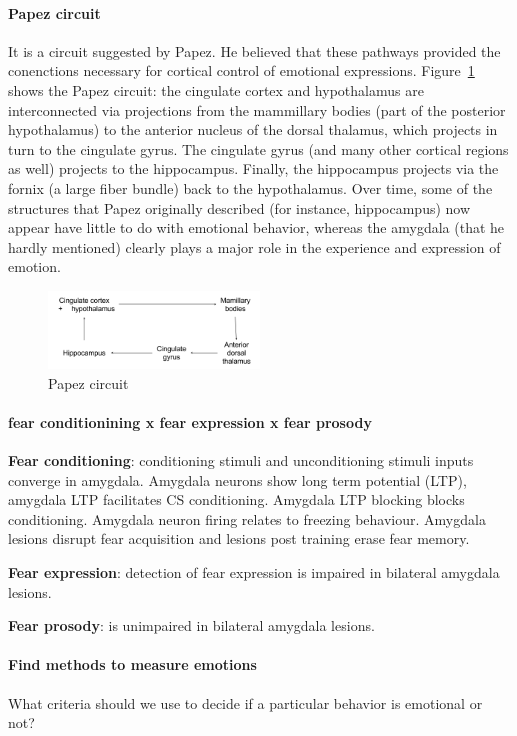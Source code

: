 \documentclass[12pt,article,oneside,a4paper]{memoir}
\begin{document}
\paragraph{Papez circuit}
It is a circuit suggested by Papez. He believed that these pathways provided
the conenctions necessary for cortical control of emotional expressions.
Figure~\ref{fig:papez-circuit} shows the Papez circuit: the cingulate cortex
and hypothalamus are interconnected via projections from the mammillary bodies
(part of the posterior hypothalamus) to the anterior nucleus of the dorsal
thalamus, which projects in turn to the cingulate gyrus.
The cingulate gyrus (and many other cortical regions as well) projects to the
hippocampus. Finally, the hippocampus projects via the fornix (a large fiber
bundle) back to the hypothalamus. Over time, some of the structures that Papez
originally described (for instance, hippocampus) now appear have little to do 
with emotional behavior, whereas the amygdala (that he hardly mentioned)
clearly plays a major role in the experience and expression of emotion.

\begin{figure}
  \centering
  \includegraphics[width=0.5\textwidth]{imgs/papez-circuit.png}
  \caption{Papez circuit}
  \label{fig:papez-circuit}
\end{figure}

\paragraph{fear conditionining x fear expression x fear prosody}
\textbf{Fear conditioning}: conditioning stimuli and unconditioning stimuli
inputs converge in amygdala. Amygdala neurons show long term potential (LTP),
amygdala LTP facilitates CS conditioning. Amygdala LTP blocking blocks
conditioning. Amygdala neuron firing relates to freezing behaviour. Amygdala
lesions disrupt fear acquisition and lesions post training erase fear memory.

\textbf{Fear expression}: detection of fear expression is impaired in bilateral
amygdala lesions.

\textbf{Fear prosody}: is unimpaired in bilateral amygdala lesions.

\paragraph{Find methods to measure emotions}
What criteria should we use to decide if a particular behavior is emotional or
not?
\end{document}
